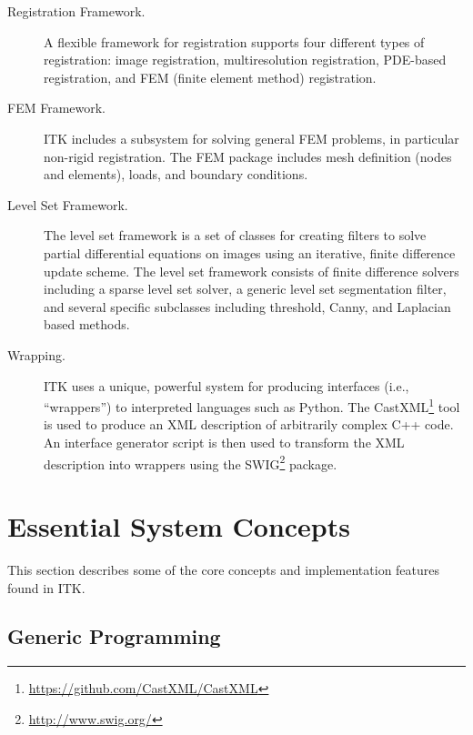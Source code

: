 \begin{description}
	\item[Registration Framework.] A flexible framework for registration
        supports four different types of registration: image registration,
        multiresolution registration, PDE-based registration, and FEM (finite
        element method) registration.

	\item[FEM Framework.] ITK includes a subsystem for solving general
        FEM problems, in particular non-rigid registration. The FEM package
        includes mesh definition (nodes and elements), loads, and boundary
        conditions.

	\item[Level Set Framework.] The level set framework is a set of
        classes for creating filters to solve partial differential equations
        on images using an iterative, finite difference update scheme. The
        level set framework consists of finite difference solvers including a
        sparse level set solver, a generic level set segmentation filter, and
        several specific subclasses including threshold, Canny, and Laplacian
        based methods.

	\item[Wrapping.] ITK uses a unique, powerful system for
	producing interfaces (i.e., ``wrappers'') to interpreted
	languages such as Python. The CastXML\footnote{\url{https://github.com/CastXML/CastXML}}
        tool is used to produce an XML description of arbitrarily complex C++ code.
	An interface generator script is then used to transform the XML description
        into wrappers using the SWIG\footnote{\url{http://www.swig.org/}} package.

\end{description}


\section{Essential System Concepts}
\label{sec:EssentialSystemConcepts}

This section describes some of the core concepts and implementation features
found in ITK.

\subsection{Generic Programming}
\label{sec:GenericProgramming}


